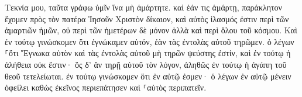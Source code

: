\documentclass{openreader}
\begin{document}
Τεκνία μου, ταῦτα γράφω ὑμῖν ἵνα μὴ ἁμάρτητε. καὶ ἐάν τις ἁμάρτῃ, παράκλητον ἔχομεν πρὸς τὸν πατέρα Ἰησοῦν Χριστὸν δίκαιον, καὶ αὐτὸς ἱλασμός ἐστιν περὶ τῶν ἁμαρτιῶν ἡμῶν, οὐ περὶ τῶν ἡμετέρων δὲ μόνον ἀλλὰ καὶ περὶ ὅλου τοῦ κόσμου. Καὶ ἐν τούτῳ γινώσκομεν ὅτι ἐγνώκαμεν αὐτόν, ἐὰν τὰς ἐντολὰς αὐτοῦ τηρῶμεν. ὁ λέγων ⸀ὅτι Ἔγνωκα αὐτὸν καὶ τὰς ἐντολὰς αὐτοῦ μὴ τηρῶν ψεύστης ἐστίν, καὶ ἐν τούτῳ ἡ ἀλήθεια οὐκ ἔστιν· ὃς δ’ ἂν τηρῇ αὐτοῦ τὸν λόγον, ἀληθῶς ἐν τούτῳ ἡ ἀγάπη τοῦ θεοῦ τετελείωται. ἐν τούτῳ γινώσκομεν ὅτι ἐν αὐτῷ ἐσμεν· ὁ λέγων ἐν αὐτῷ μένειν ὀφείλει καθὼς ἐκεῖνος περιεπάτησεν καὶ ⸀αὐτὸς περιπατεῖν. 
\end{document}
